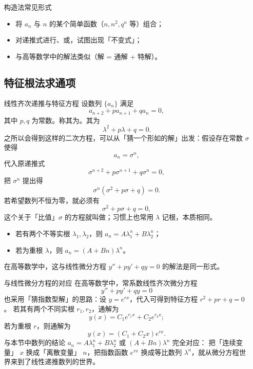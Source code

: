 \documentclass[a4paper,11pt]{ctexart}
\begin{document}
\begin{sideinfobox}{构造法常见形式}
  \begin{itemize}
    \item 将 $a_n$ 与 $n$ 的某个简单函数（$n,n^2,q^n$ 等）组合；
    \item 对递推式进行、或，试图出现「不变式」；
    \item 与高等数学中的解法类似（解 = 通解 + 特解）。
  \end{itemize}
\end{sideinfobox}

\subsection{特征根法求通项}

\begin{definitionbox}{线性齐次递推与特征方程}
  设数列 $\{a_n\}$ 满足
  \[
    a_{n+2}+p a_{n+1}+q a_n=0,
  \]
  其中 $p,q$ 为常数。称其为。其为
  \[
    \lambda^2+p\lambda+q=0.
  \]
  之所以会得到这样的二次方程，可以从「猜一个形如的解」出发：假设存在常数 $\sigma$ 使得
  \[
    a_n=\sigma^n,
  \]
  代入原递推式
  \[
    \sigma^{n+2}+p\sigma^{n+1}+q\sigma^n=0,
  \]
  把 $\sigma^n$ 提出得
  \[
    \sigma^n(\sigma^2+p\sigma+q)=0.
  \]
  若希望数列不恒为零，就必须有
  \[
    \sigma^2+p\sigma+q=0,
  \]
  这个关于「比值」$\sigma$ 的方程就叫做；习惯上也常用 $\lambda$ 记根，本质相同。
  \begin{itemize}
    \item 若有两个不等实根 $\lambda_1,\lambda_2$，则 $a_n=A\lambda_1^n+B\lambda_2^n$；
    \item 若为重根 $\lambda$，则 $a_n=(A+Bn)\lambda^n$。
  \end{itemize}
  在高等数学中，这与线性微分方程 $y''+py'+qy=0$ 的解法是同一形式。
\end{definitionbox}

\begin{sideinfobox}{与线性微分方程的对应}
  在高等数学中，常系数线性齐次微分方程
  \[
    y''+py'+qy=0
  \]
  也采用「猜指数型解」的思路：设 $y=e^{rx}$，代入可得到特征方程 $r^2+pr+q=0$。
  若其有两个不同实根 $r_1,r_2$，通解为
  \[
    y(x)=C_1e^{r_1x}+C_2e^{r_2x};
  \]
  若为重根 $r$，则通解为
  \[
    y(x)=(C_1+C_2x)e^{rx}.
  \]
  与本节中数列的结论 $a_n=A\lambda_1^n+B\lambda_2^n$ 或 $(A+Bn)\lambda^n$ 完全对应：
  把「连续变量」 $x$ 换成「离散变量」 $n$，把指数函数 $e^{rx}$ 换成等比数列 $\lambda^n$，就从微分方程世界来到了线性递推数列的世界。
\end{sideinfobox}
\end{document}
